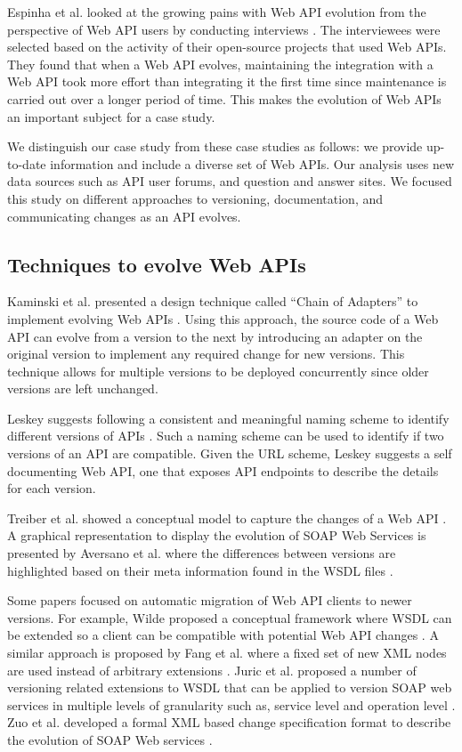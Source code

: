 \documentclass[conference]{IEEEtran}
\begin{document}
Espinha et al. looked at the growing pains with Web API evolution from the perspective of Web API users by conducting interviews \cite{espinha}. The interviewees were selected based on the activity of their open-source projects that used Web APIs. They found that when a Web API evolves, maintaining the integration with a Web API took more effort than integrating it the first time since maintenance is carried out over a longer period of time. This makes the evolution of Web APIs an important subject for a case study.

We distinguish our case study from these case studies as follows: we provide up-to-date information and include a diverse set of Web APIs. Our analysis uses new data sources such as API user forums, and question and answer sites. We focused this study on different approaches to versioning, documentation, and communicating changes as an API evolves.

\subsection{Techniques to evolve Web APIs} %
\label{sub:techniques}
Kaminski et al. presented a design technique called ``Chain of Adapters'' to implement evolving Web APIs \cite{kaminski2006design}. Using this approach, the source code of a Web API can evolve from a version to the next by introducing an adapter on the original version to implement any required change for new versions. This technique allows for multiple versions to be deployed concurrently since older versions are left unchanged.

Leskey suggests following a consistent and meaningful naming scheme to identify different versions of APIs \cite{laskey2008considerations}. Such a naming scheme can be used to identify if two versions of an API are compatible. Given the URL scheme, Leskey suggests a self documenting Web API, one that exposes API endpoints to describe the details for each version.

Treiber et al. showed a conceptual model to capture the changes of a Web API \cite{treiber2009analyzing}. A graphical representation to display the evolution of SOAP Web Services is presented by Aversano et al. where the differences between versions are highlighted based on their meta information found in the WSDL files \cite{aversano2005visualizing}.

Some papers focused on automatic migration of Web API clients to newer versions. For example, Wilde proposed a conceptual framework where WSDL can be extended so a client can be compatible with potential Web API changes \cite{wilde2004semantically}. A similar approach is proposed by Fang et al. where a fixed set of new XML nodes are used instead of arbitrary extensions \cite{fang2007version}. Juric et al. proposed a number of versioning related extensions to WSDL that can be applied to version SOAP web services in multiple levels of granularity such as, service level and operation level \cite{Juric20091326}. Zuo et al. developed a formal XML based change specification format to describe the evolution of SOAP Web services \cite{zuo6928972}.
\end{document}

